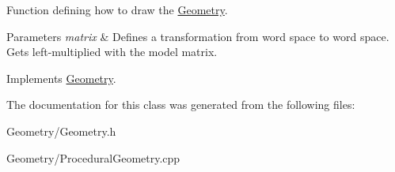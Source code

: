 Function defining how to draw the \mbox{\hyperlink{class_geometry}{Geometry}}.


\begin{DoxyParams}{Parameters}
{\em matrix} & Defines a transformation from word space to word space. Gets left-\/multiplied with the model matrix. \\
\hline
\end{DoxyParams}


Implements \mbox{\hyperlink{class_geometry_a417f18c0d1f3c8a09ee93023c0a8330d}{Geometry}}.



The documentation for this class was generated from the following files\+:\begin{DoxyCompactItemize}
\item 
Geometry/Geometry.\+h\item 
Geometry/Procedural\+Geometry.\+cpp\end{DoxyCompactItemize}
